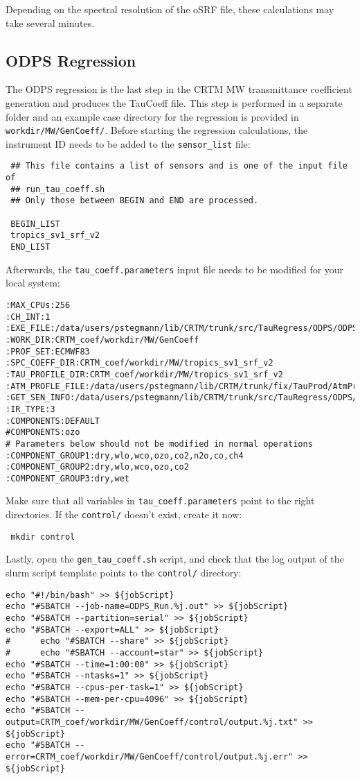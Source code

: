 Depending on the spectral resolution of the oSRF file, these calculations may take several minutes.

\subsection{ODPS Regression}
The ODPS regression is the last step in the CRTM MW transmittance coefficient generation and produces the TauCoeff file.
This step is performed in a separate folder and an example case directory for the regression is provided in \verb|workdir/MW/GenCoeff/|.
Before starting the regression calculations, the instrument ID needs to be added to the \verb|sensor_list| file:
\begin{verbatim}
 ## This file contains a list of sensors and is one of the input file of
 ## run_tau_coeff.sh
 ## Only those between BEGIN and END are processed.

 BEGIN_LIST
 tropics_sv1_srf_v2
 END_LIST
\end{verbatim}
Afterwards, the \verb|tau_coeff.parameters| input file needs to be modified for your local system:
\begin{verbatim}
:MAX_CPUs:256
:CH_INT:1
:EXE_FILE:/data/users/pstegmann/lib/CRTM/trunk/src/TauRegress/ODPS/ODPS_Regress/Compute_Coeff
:WORK_DIR:CRTM_coef/workdir/MW/GenCoeff
:PROF_SET:ECMWF83
:SPC_COEFF_DIR:CRTM_coef/workdir/MW/tropics_sv1_srf_v2
:TAU_PROFILE_DIR:CRTM_coef/workdir/MW/tropics_sv1_srf_v2
:ATM_PROFLE_FILE:/data/users/pstegmann/lib/CRTM/trunk/fix/TauProd/AtmProfile/ECMWF83.AtmProfile.nc
:GET_SEN_INFO:/data/users/pstegmann/lib/CRTM/trunk/src/TauRegress/ODPS/GetSenInfo/GetSenInfo
:IR_TYPE:3
:COMPONENTS:DEFAULT
#COMPONENTS:ozo
# Parameters below should not be modified in normal operations
:COMPONENT_GROUP1:dry,wlo,wco,ozo,co2,n2o,co,ch4
:COMPONENT_GROUP2:dry,wlo,wco,ozo,co2
:COMPONENT_GROUP3:dry,wet
\end{verbatim}
Make sure that all variables in \verb|tau_coeff.parameters| point to the right directories.
If the \verb|control/| doesn't exist, create it now:
\begin{verbatim}
 mkdir control
\end{verbatim}
Lastly, open the \verb|gen_tau_coeff.sh| script, and check that the log output of the slurm script template points to the \verb|control/| directory:
\begin{verbatim}
echo "#!/bin/bash" >> ${jobScript}
echo "#SBATCH --job-name=ODPS_Run.%j.out" >> ${jobScript}
echo "#SBATCH --partition=serial" >> ${jobScript}
echo "#SBATCH --export=ALL" >> ${jobScript}
#      echo "#SBATCH --share" >> ${jobScript}
#      echo "#SBATCH --account=star" >> ${jobScript}
echo "#SBATCH --time=1:00:00" >> ${jobScript}
echo "#SBATCH --ntasks=1" >> ${jobScript}
echo "#SBATCH --cpus-per-task=1" >> ${jobScript}
echo "#SBATCH --mem-per-cpu=4096" >> ${jobScript}
echo "#SBATCH --output=CRTM_coef/workdir/MW/GenCoeff/control/output.%j.txt" >> ${jobScript}
echo "#SBATCH --error=CRTM_coef/workdir/MW/GenCoeff/control/output.%j.err" >> ${jobScript}
\end{verbatim}

